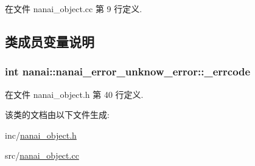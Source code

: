 在文件 nanai\+\_\+object.\+cc 第 9 行定义.



\subsection{类成员变量说明}
\hypertarget{classnanai_1_1nanai__error__unknow__error_a1d843ccc2365e828549cfea01bab26f8}{}
\subsubsection[{\+\_\+errcode}]{\setlength{\rightskip}{0pt plus 5cm}int nanai\+::nanai\+\_\+error\+\_\+unknow\+\_\+error\+::\+\_\+errcode}\label{classnanai_1_1nanai__error__unknow__error_a1d843ccc2365e828549cfea01bab26f8}


在文件 nanai\+\_\+object.\+h 第 40 行定义.



该类的文档由以下文件生成\+:\begin{DoxyCompactItemize}
\item 
inc/\hyperlink{nanai__object_8h}{nanai\+\_\+object.\+h}\item 
src/\hyperlink{nanai__object_8cc}{nanai\+\_\+object.\+cc}\end{DoxyCompactItemize}
